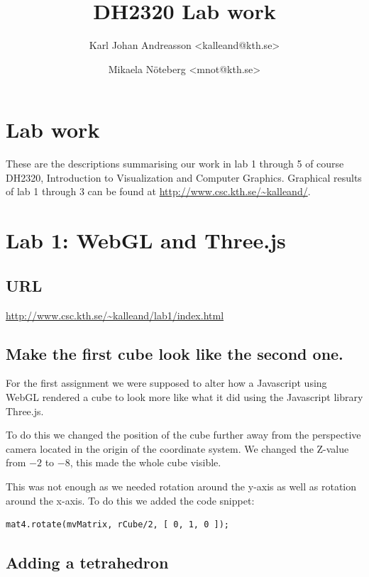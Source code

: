 \documentclass[a4paper]{article}
\title{DH2320 Lab work}
\author{Karl Johan Andreasson <{kalleand@kth.se}> %
\and Mikaela N\"oteberg <{mnot@kth.se}>
}
\begin{document}
\thispagestyle{empty}
\maketitle
\thispagestyle{empty}
\pagestyle{empty}
\newpage
\pagestyle{fancy}
\setcounter{page}{1}

\section*{Lab work}
These are the descriptions summarising our work in lab 1 through 5 of course
DH2320, Introduction to Visualization and Computer Graphics. Graphical results
of lab 1 through 3 can be found at \url{http://www.csc.kth.se/~kalleand/}.

\section{Lab 1: WebGL and Three.js}

\subsection*{URL}
\url{http://www.csc.kth.se/~kalleand/lab1/index.html}

\subsection{Make the first cube look like the second one.}

For the first assignment we were supposed to alter how a Javascript using WebGL rendered a
cube to look more like what it did using the Javascript library Three.js.

To do this we changed the position of the cube further away from the perspective
camera located in the origin of the coordinate system. We changed the Z-value
from $-2$ to $-8$, this made the whole cube visible.

This was not enough as we needed rotation around the y-axis as well as
rotation around the x-axis. To do this we added the code snippet:

\begin{verbatim}
mat4.rotate(mvMatrix, rCube/2, [ 0, 1, 0 ]);
\end{verbatim}

\subsection{Adding a tetrahedron}
\end{document}
